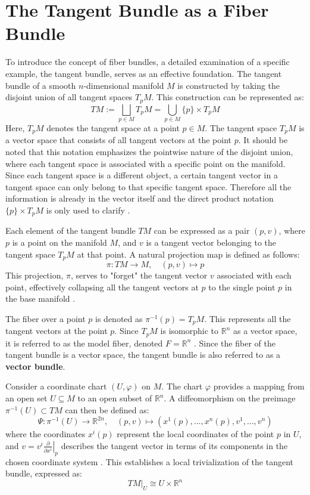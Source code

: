 \section{The Tangent Bundle as a Fiber Bundle}

To introduce the concept of fiber bundles, a detailed examination of a specific example, the tangent bundle, serves as an effective foundation.
The tangent bundle of a smooth \( n \)-dimensional manifold \( M \) is constructed by taking the disjoint union of all tangent spaces \( T_pM \). This construction can be represented as:
\[
TM := \bigsqcup_{p \in M} T_pM = \bigcup_{p \in M} \{p\} \times T_pM
\]
Here, \( T_pM \) denotes the tangent space at a point \( p \in M \). The tangent space \( T_pM \) is a vector space that consists of all tangent vectors at the point \( p \). It should be noted that this notation emphasizes the pointwise nature of the disjoint union, where each tangent space is associated with a specific point on the manifold. Since each tangent space is a different object, a certain tangent vector in a tangent space can only belong to that specific tangent space. Therefore all the information is already in the vector itself and the direct product notation \( \{p\} \times T_pM \) is only used to clarify \cite{FredericSchullerTopologicalmanifoldsmanifoldbundlesLec06FredericSchuller2015}.

Each element of the tangent bundle \( TM \) can be expressed as a pair \( (p, v) \), where \( p \) is a point on the manifold \( M \), and \( v \) is a tangent vector belonging to the tangent space \( T_pM \) at that point. 
A natural projection map is defined as follows:
\[
\pi: TM \to M, \quad (p, v) \mapsto p
\]
This projection, \( \pi \), serves to "forget" the tangent vector \( v \) associated with each point, effectively collapsing all the tangent vectors at \( p \) to the single point \( p \) in the base manifold \cite{NakaharaGeometrytopologyphysics2005}.

The fiber over a point \( p \) is denoted as \( \pi^{-1}(p) = T_pM \). This represents all the tangent vectors at the point \( p \). Since \( T_pM \) is isomorphic to \( \mathbb{R}^n \) as a vector space, it is referred to as the model fiber, denoted \( F = \mathbb{R}^n \) \cite{NakaharaGeometrytopologyphysics2005}.
Since the fiber of the tangent bundle is a vector space, the tangent bundle is also referred to as a \textbf{vector bundle}.

Consider a coordinate chart \( (U, \varphi) \) on \( M \). The chart \( \varphi \) provides a mapping from an open set \( U \subseteq M \) to an open subset of \( \mathbb{R}^n \). A diffeomorphism on the preimage \( \pi^{-1}(U) \subset TM \) can then be defined as:
\[
\Psi: \pi^{-1}(U) \to \mathbb{R}^{2n}, \quad (p, v) \mapsto \left(x^1(p), \dots, x^n(p), v^1, \dots, v^n \right)
\]
where the coordinates \( x^i(p) \) represent the local coordinates of the point \( p \) in \( U \), and \( v = v^i \left. \frac{\partial}{\partial x^i} \right|_p \) describes the tangent vector in terms of its components in the chosen coordinate system \cite{NakaharaGeometrytopologyphysics2005}.
This establishes a local trivialization of the tangent bundle, expressed as:
\[
TM|_U \cong U \times \mathbb{R}^n
\]

